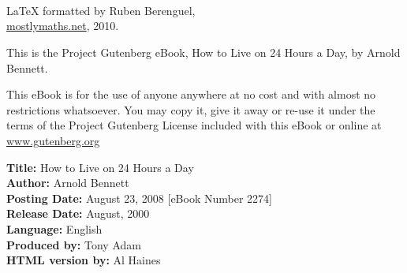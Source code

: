 


\thispagestyle{empty}
\begin{center} 
  {
    \MakeUppercase{\fontsize{1cm}{1cm}\selectfont{How to Live on}}\\
\vspace*{0.3em}
    \textit{\MakeUppercase{\fontsize{1.1cm}{1.1cm}\selectfont{Twenty-Four}}}\\
\vspace*{0.3em}
    \MakeUppercase{\fontsize{1cm}{1cm}\selectfont{Hours a Day}}
    }\\
  \vspace*{1em}
  {
    \color{darkgray}\MakeUppercase{\fontsize{0.5cm}{0.5cm}\selectfont{Arnold Bennett}
    }}
\end{center}
\newpage
\vspace*{3cm}
\newpage
\color{black}
\thispagestyle{empty}
\begin{center}
  LaTeX formatted by Ruben Berenguel,\\
  \href{http://www.mostlymaths.net}{mostlymaths.net}, 2010.
\end{center}
\vspace*{1em}
{This is the Project Gutenberg eBook, How to Live on 24 Hours a Day, by Arnold
  Bennett.} 

\footnotesize\vspace*{1em} This eBook is for the use of anyone anywhere at
no cost and with almost no restrictions whatsoever. You may copy it,
give it away or re-use it under the terms of the Project Gutenberg
License included with this eBook or online at
\href{http://www.gutenberf.org}{www.gutenberg.org} \vspace*{1em}

\noindent\textbf{Title:} How to Live on 24 Hours a Day\\
\textbf{Author:} Arnold Bennett\\
\textbf{Posting Date:} August 23, 2008  [eBook Number 2274]\\
\textbf{Release Date:} August, 2000\\
\textbf{Language:} English\\
\textbf{Produced by:} Tony Adam\\
\textbf{HTML version by:} Al Haines\\
\vspace*{1em} 

